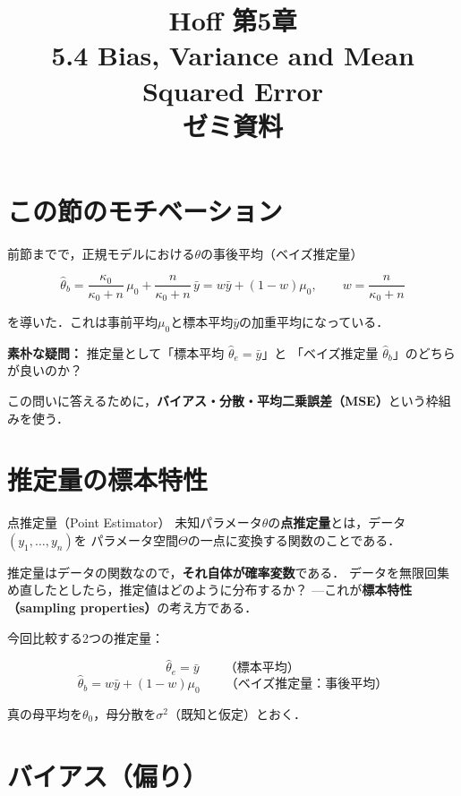 \documentclass[lualatex,ja=standard,a4paper,12pt]{bxjsarticle}
\title{{\large Hoff 第5章} \\[6pt]
       \textbf{5.4\; Bias, Variance and Mean Squared Error} \\[4pt]
       {\normalsize ゼミ資料}}
\author{}
\date{}
\begin{document}
\maketitle
\thispagestyle{empty}

\section{この節のモチベーション}

前節までで，正規モデルにおける$\theta$の事後平均（ベイズ推定量）

\[
  \hat{\theta}_b = \frac{\kappa_0}{\kappa_0+n}\,\mu_0
                 + \frac{n}{\kappa_0+n}\,\bar{y}
                 = w\bar{y} + (1-w)\mu_0,
  \qquad w = \frac{n}{\kappa_0+n}
\]

を導いた．これは事前平均$\mu_0$と標本平均$\bar{y}$の加重平均になっている．

\medskip
\noindent
\textbf{素朴な疑問：} 推定量として「標本平均 $\hat{\theta}_e = \bar{y}$」と
「ベイズ推定量 $\hat{\theta}_b$」のどちらが良いのか？

\medskip
\noindent
この問いに答えるために，\textbf{バイアス・分散・平均二乗誤差（MSE）}という枠組みを使う．

\section{推定量の標本特性}

\begin{defbox}{点推定量（Point Estimator）}
未知パラメータ$\theta$の\textbf{点推定量}とは，データ$(y_1,\ldots,y_n)$を
パラメータ空間$\Theta$の一点に変換する関数のことである．
\end{defbox}

\medskip
推定量はデータの関数なので，\textbf{それ自体が確率変数}である．
データを無限回集め直したとしたら，推定値はどのように分布するか？
---これが\textbf{標本特性（sampling properties）}の考え方である．

\bigskip
今回比較する2つの推定量：

\[
  \hat{\theta}_e = \bar{y}
  \qquad \text{（標本平均）}
\]
\[
  \hat{\theta}_b = w\bar{y} + (1-w)\mu_0
  \qquad \text{（ベイズ推定量：事後平均）}
\]

真の母平均を$\theta_0$，母分散を$\sigma^2$（既知と仮定）とおく．

\section{バイアス（偏り）}
\end{document}
